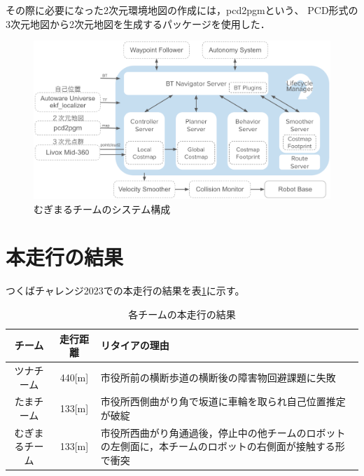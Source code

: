 \documentclass[twocolumn,9pt]{jsproceedings}
\begin{document}
その際に必要になった2次元環境地図の作成には，pcd2pgmという、
PCD形式の3次元地図から2次元地図を生成するパッケージを使用した．

\begin{figure}[h]
  \begin{center}
    \includegraphics[width=1.0\linewidth]{figs/mugimaru_system.pdf}
    \caption{むぎまるチームのシステム構成}
    \label{fig:mugimaru_system}
  \end{center}
\end{figure}



\section{本走行の結果}

つくばチャレンジ2023での本走行の結果を表\ref{MainRun}に示す。

\begin{table}[H]
  \caption{各チームの本走行の結果}
  \label{MainRun}
  \begin{tabular}{|c|c|p{4.0cm}|}
    \hline
    チーム         & 走行距離 & リタイアの理由                                                                                             \\
    \hline
    ツナチーム     & 440[m]   & 市役所前の横断歩道の横断後の障害物回避課題に失敗                                                           \\
    \hline
    たまチーム     & 133[m]   & 市役所西側曲がり角で坂道に車輪を取られ自己位置推定が破綻                                                   \\
    \hline
    むぎまるチーム & 133[m]    & 市役所西曲がり角通過後，停止中の他チームのロボットの左側面に，本チームのロボットの右側面が接触する形で衝突 \\
    \hline
  \end{tabular}
\end{table}
\end{document}
